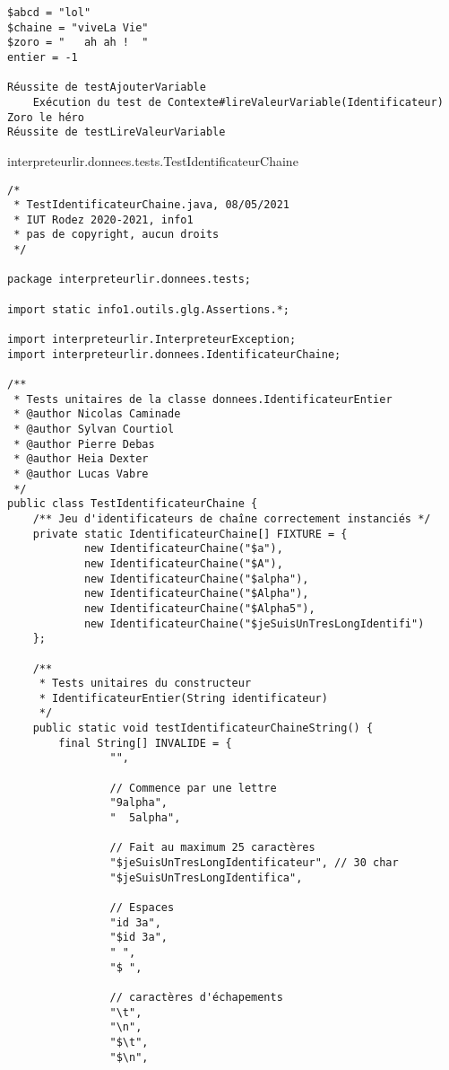 \begin{enum}
\begin{verbatim}
$abcd = "lol"
$chaine = "viveLa Vie"
$zoro = "   ah ah !  "
entier = -1

Réussite de testAjouterVariable
    Exécution du test de Contexte#lireValeurVariable(Identificateur)
Zoro le héro
Réussite de testLireValeurVariable
\end{verbatim}

    \item interpreteurlir.donnees.tests.TestIdentificateurChaine
\begin{verbatim}
/*
 * TestIdentificateurChaine.java, 08/05/2021
 * IUT Rodez 2020-2021, info1
 * pas de copyright, aucun droits
 */

package interpreteurlir.donnees.tests;

import static info1.outils.glg.Assertions.*;

import interpreteurlir.InterpreteurException;
import interpreteurlir.donnees.IdentificateurChaine;

/**
 * Tests unitaires de la classe donnees.IdentificateurEntier
 * @author Nicolas Caminade
 * @author Sylvan Courtiol
 * @author Pierre Debas
 * @author Heia Dexter
 * @author Lucas Vabre
 */
public class TestIdentificateurChaine {
    /** Jeu d'identificateurs de chaîne correctement instanciés */
    private static IdentificateurChaine[] FIXTURE = {
            new IdentificateurChaine("$a"),
            new IdentificateurChaine("$A"),
            new IdentificateurChaine("$alpha"),
            new IdentificateurChaine("$Alpha"),
            new IdentificateurChaine("$Alpha5"),
            new IdentificateurChaine("$jeSuisUnTresLongIdentifi")
    };

    /**
     * Tests unitaires du constructeur 
     * IdentificateurEntier(String identificateur)
     */
    public static void testIdentificateurChaineString() {
        final String[] INVALIDE = {
                "",

                // Commence par une lettre
                "9alpha",
                "  5alpha",

                // Fait au maximum 25 caractères
                "$jeSuisUnTresLongIdentificateur", // 30 char
                "$jeSuisUnTresLongIdentifica",

                // Espaces
                "id 3a",
                "$id 3a",
                " ",
                "$ ",

                // caractères d'échapements
                "\t",
                "\n",
                "$\t",
                "$\n",


\end{verbatim}
\end{enum}
